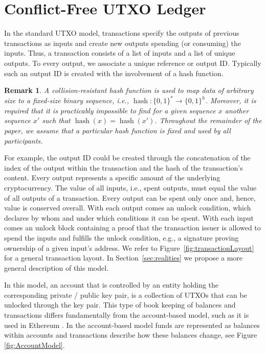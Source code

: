 \documentclass[11pt]{article}
\newcommand{\hash}{\mathop{\mathrm{hash}}}
\theoremstyle{plain}
\newtheorem{remark}{Remark}
\theoremstyle{definition}
\numberwithin{definition}{section}
\numberwithin{lemma}{section}
\numberwithin{ass}{section}
\numberwithin{remark}{section}
\numberwithin{example}{section}
\numberwithin{proposition}{section}
\numberwithin{theorem}{section}
\begin{document}
\section{Conflict-Free UTXO Ledger}\label{sec: Standard UTXO}

In the standard UTXO model, transactions specify the outputs of previous transactions as inputs and create new outputs spending (or consuming) the inputs. 
Thus, a transaction consists of a list of inputs and a list of unique outputs. To every output, we associate a unique reference or output ID. Typically such an output ID is created with the involvement of a hash function.
\begin{remark}\label{rem: hash function}
A collision-resistant hash function is used to map data of arbitrary size to a fixed-size binary sequence, i.e., $\hash: \{0,1\}^*\to \{0,1\}^h$. Moreover, it is required that it is practicably impossible to find for a given sequence $x$ another sequence $x'$ such that $\hash(x) =\hash(x')$.
Throughout the remainder of the paper, we assume that a particular hash function is fixed and used by all participants.
\end{remark}
For example, the output ID could be created through the concatenation of the index of the output within the transaction and the hash of the transaction's content.
Every output represents a specific amount of the underlying cryptocurrency. The value of all inputs, i.e., spent outputs, must equal the value of all outputs of a transaction.
Every output can be spent only once and, hence, value is conserved overall.
With each output comes an unlock condition, which declares by whom and under which conditions it can be spent. With each input comes an unlock block containing a proof that the transaction issuer is allowed to spend the inputs and fulfills the unlock condition, e.g., a signature proving ownership of a given input's address. We refer to Figure~\ref{fig:transactionLayout} for a general transaction layout. In Section~\ref{sec:realities} we propose a more general description of this model. 

In this model, an account that is controlled by an entity holding the corresponding private / public key pair, is a collection of UTXOs that can be unlocked through the key pair. This type of book keeping of balances and transactions differs fundamentally from the account-based model, such as it is used in Ethereum \cite{buterin2013ethereum}. In the account-based model funds are represented as balances within accounts and transactions describe how these balances change, see Figure \ref{fig:AccountModel}. 
\end{document}
